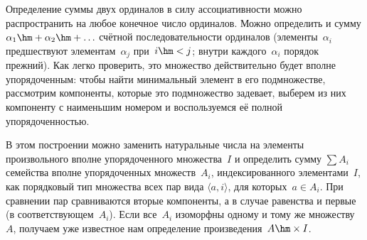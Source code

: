 Определение суммы двух ординалов в силу ассоциативности можно
распространить на любое конечное число ординалов. Можно
определить и сумму $\alpha_1\hm+\alpha_2\hm+\ldots$ счётной
последовательности ординалов (элементы~$\alpha_i$ предшествуют
элементам~$\alpha_j$ при~$i\hm<j$; внутри каждого~$\alpha_i$
порядок прежний). Как легко проверить, это
множество действительно
будет вполне упорядоченным: чтобы найти минимальный элемент в его
подмножестве, рассмотрим компоненты, которые это подмножество
задевает, выберем из них компоненту с наименьшим номером и
воспользуемся её полной упорядоченностью.

В этом построении можно заменить натуральные числа на элементы
произвольного вполне упорядоченного множества~$I$ и определить
сумму $\sum A_i$ семейства вполне упорядоченных
множеств~$A_i$, индексированного элементами~$I$, как порядковый
тип множества всех пар вида $\langle a,i\rangle$, для которых~$a\in A_i$.
При сравнении пар сравниваются вторые компоненты, а в случае
равенства и первые (в соответствующем~$A_i$). Если все~$A_i$
изоморфны одному и тому же множеству~$A$, получаем уже известное
нам определение произведения~$A\hm\times I$.

